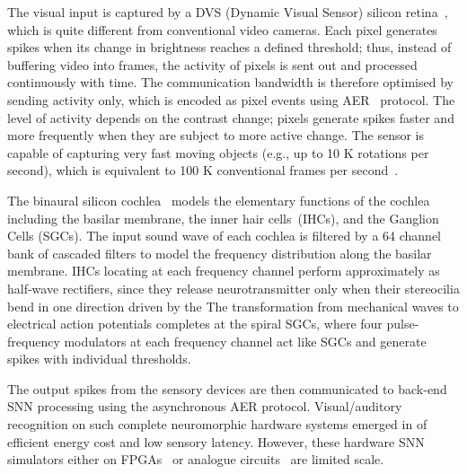 The visual input is captured by a DVS (Dynamic Visual Sensor) silicon retina~\citep{serrano2013128, delbruck2008frame}, which is quite different from conventional video cameras.
Each pixel generates spikes when its change in brightness reaches a defined threshold;
thus, instead of buffering video into frames, the activity of pixels is sent out and processed continuously with time.
The communication bandwidth is therefore optimised by sending activity only, which is encoded as pixel events using \protect{} AER~\citep{lazzaro1995multi} protocol.
The level of activity depends on the contrast change; pixels generate spikes faster and more frequently when they are subject to more active change.
The sensor is capable of capturing very fast moving objects (e.g., up to 10 K rotations per second), which is equivalent to 100 K conventional frames per second~\citep{lenero20113}.
\protect{}\citep{7850249}\protect{}

The binaural silicon cochlea~\citep{5537164} models the elementary functions of the cochlea including the basilar membrane, the inner hair cells~(IHCs), and the \protect{} \protect{} Ganglion Cells (SGCs).
The input sound wave of each cochlea is filtered by a 64 channel bank of cascaded filters to model the frequency distribution along the basilar membrane.
IHCs locating at each frequency channel perform approximately as half-wave rectifiers, since they release neurotransmitter only when their stereocilia bend in one direction driven by the \protect{} \protect{}
The transformation from mechanical waves to electrical action potentials completes at the spiral SGCs, where four pulse-frequency modulators at each frequency channel act like SGCs and generate spikes with individual thresholds.


The output spikes from the sensory devices are then communicated to back-end SNN processing using the asynchronous AER protocol.
Visual/auditory recognition on such complete neuromorphic hardware systems \protect{} \protect{} emerged in \protect{} \protect{} of efficient energy cost and low sensory latency.
However, these hardware SNN simulators either \protect{} \protect{} on FPGAs~\citep{neil2014minitaur, kiselev2016event} or analogue circuits~\citep{qiao2015reconfigurable} \protect{} are limited \protect{} \protect{} scale.

